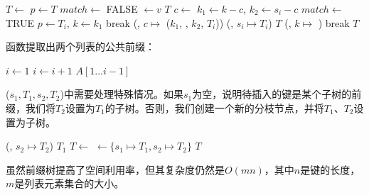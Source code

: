 \documentclass[b5paper]{ctexart}
\begin{document}
\begin{algorithmic}[1]
   \State $T \gets$ 
  \EndIf
  \State $p \gets T$
  \Loop
    \State $match \gets$ FALSE
        \State {} $\gets v$ 
        \State \Return $T$
      \EndIf
      \State $c \gets$ 
      \State $k_1 \gets k - c$, $k_2 \gets s_i - c$
        \State $match \gets$ TRUE
         
          \State $p \gets T_i$, $k \gets k_1$
          \State break
        \Else {}
          \State {}(, $c \mapsto$ ($k_1$, , $k_2$, $T_i$))
          \State {}(, $s_i \mapsto T_i$)
          \State \Return $T$
        \EndIf
      \EndIf
    \EndFor
     
      \State {}(, $k \mapsto$ )
      \State break
    \EndIf
  \EndLoop
  \State \Return $T$
\EndFunction
\end{algorithmic}

函数提取出两个列表的公共前缀：

\begin{algorithmic}[1]
  \State $i \gets 1 $
    \State $i \gets i + 1$
  \EndWhile
  \State \Return $A[1...i-1]$
\EndFunction
\end{algorithmic}

($s_1, T_1, s_2, T_2$)中需要处理特殊情况。如果$s_1$为空，说明待插入的键是某个子树的前缀，我们将$T_2$设置为$T_1$的子树。否则，我们创建一个新的分枝节点，并将$T_1$、$T_2$设置为子树。

\begin{algorithmic}[1]
    \State {}(, $s_2 \mapsto T_2$)
    \State \Return $T_1$
  \EndIf
  \State $T \gets$ 
  \State {} $\gets \{s_1 \mapsto T_1, s_2 \mapsto T_2\}$
  \State \Return $T$
\EndFunction
\end{algorithmic}

虽然前缀树提高了空间利用率，但其复杂度仍然是$O(mn)$，其中$n$是键的长度，$m$是列表元素集合的大小。


\end{document}
